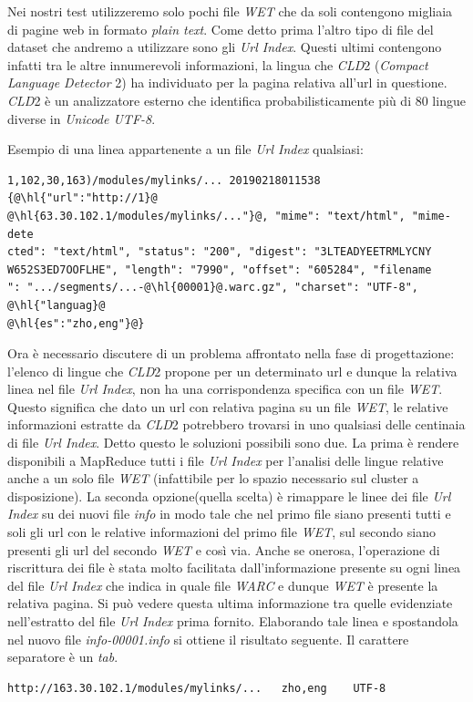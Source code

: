 \documentclass{article}
\newcommand{\MR}{MapReduce}
\newcommand{\cld}{\textit{CLD}2}
\newcommand{\WET}{\textit{WET}}
\newcommand{\UrlIndex}{\textit{Url Index}}
\newcommand{\info}{\textit{info}}
\newcommand{\pt}{\textit{plain text}}
\newcommand{\filename}[1]{\textit{#1}}
\begin{document}
Nei nostri test utilizzeremo solo pochi file \WET{} che da soli contengono migliaia di pagine web in formato \pt{}. Come detto prima l'altro tipo di file del dataset che andremo a utilizzare sono gli \UrlIndex{}. Questi ultimi contengono infatti tra le altre innumerevoli informazioni, la lingua che \cld{} (\textit{Compact Language Detector} 2) ha individuato per la pagina relativa all'url in questione. \cld{} è un analizzatore esterno che identifica probabilisticamente più di 80 lingue diverse in \textit{Unicode UTF-8}.

Esempio di una linea appartenente a un file \UrlIndex{} qualsiasi:
\begin{verbatim}
1,102,30,163)/modules/mylinks/... 20190218011538 {@\hl{"url":"http://1}@
@\hl{63.30.102.1/modules/mylinks/..."}@, "mime": "text/html", "mime-dete
cted": "text/html", "status": "200", "digest": "3LTEADYEETRMLYCNY
W652S3ED7OOFLHE", "length": "7990", "offset": "605284", "filename
": ".../segments/...-@\hl{00001}@.warc.gz", "charset": "UTF-8", @\hl{"languag}@
@\hl{es":"zho,eng"}@}
\end{verbatim}

Ora è necessario discutere di un problema affrontato nella fase di progettazione: l'elenco di lingue che \cld{} propone per un determinato url e dunque la relativa linea nel file \UrlIndex{}, non ha una corrispondenza specifica con un file \WET{}. Questo significa che dato un url con relativa pagina su un file \WET{}, le relative informazioni estratte da \cld{} potrebbero trovarsi in uno qualsiasi delle centinaia di file \UrlIndex{}. Detto questo le soluzioni possibili sono due. La prima è rendere disponibili a \MR{} tutti i file \UrlIndex{} per l'analisi delle lingue relative anche a un solo file \WET{} (infattibile per lo spazio necessario sul cluster a disposizione). La seconda opzione(quella scelta) è rimappare le linee dei file \UrlIndex{} su dei nuovi file \info{} in modo tale che nel primo file siano presenti tutti e soli gli url con le relative informazioni del primo file \WET{}, sul secondo siano presenti gli url del secondo \WET{} e così via.
Anche se onerosa, l'operazione di riscrittura dei file è stata molto facilitata dall'informazione presente su ogni linea del file \UrlIndex{} che indica in quale file \textit{WARC} e dunque \WET{} è presente la relativa pagina. Si può vedere questa ultima informazione tra quelle evidenziate nell'estratto del file \UrlIndex{} prima fornito. Elaborando tale linea e spostandola nel nuovo file \filename{info-00001.info} si ottiene il risultato seguente. Il carattere separatore è un \textit{tab}.
\begin{verbatim}
http://163.30.102.1/modules/mylinks/...   zho,eng    UTF-8 
\end{verbatim}
\end{document}
